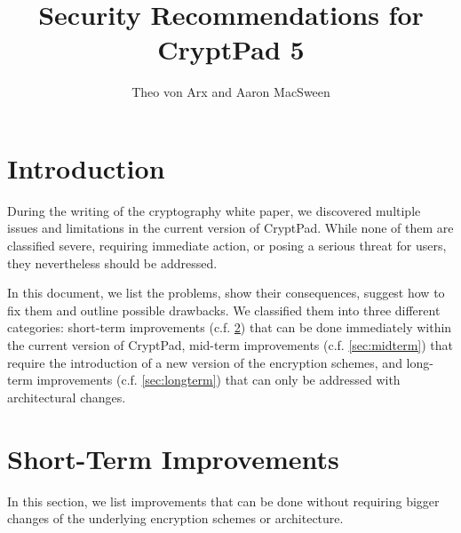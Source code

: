 \documentclass[a4paper, 11pt]{article}
\begin{document}

\author{Theo von Arx and Aaron MacSween}

\title{Security Recommendations for CryptPad 5}

\maketitle

\tableofcontents

\section{Introduction}

  During the writing of the cryptography white paper, we discovered multiple issues and limitations in the current version of CryptPad.
  While none of them are classified severe, requiring immediate action, or posing a serious threat for users, they nevertheless should be addressed.

  In this document, we list the problems, show their consequences, suggest how to fix them and outline possible drawbacks.
  We classified them into three different categories: short-term improvements (c.f. \cref{sec:shortterm}) that can be done immediately within the current version of CryptPad, mid-term improvements (c.f. \cref{sec:midterm}) that require the introduction of a new version of the encryption schemes, and long-term improvements (c.f. \cref{sec:longterm}) that can only be addressed with architectural changes.


\section{Short-Term Improvements} \label{sec:shortterm} %
  In this section, we list improvements that can be done without requiring bigger changes of the underlying encryption schemes or architecture.

  
  
  
  
  
  
  
  
  
  
  
\end{document}
